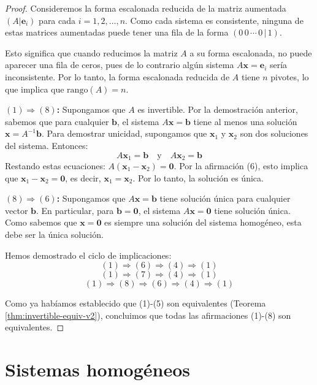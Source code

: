 \begin{proof}
Consideremos la forma escalonada reducida de la matriz aumentada $(A|\mathbf{e}_i)$ para cada $i = 1, 2, \ldots, n$. Como cada sistema es consistente, ninguna de estas matrices aumentadas puede tener una fila de la forma $(0 \, 0 \, \cdots \, 0 \, | \, 1)$.

Esto significa que cuando reducimos la matriz $A$ a su forma escalonada, no puede aparecer una fila de ceros, pues de lo contrario algún sistema $A\mathbf{x}=\mathbf{e}_i$ sería inconsistente. Por lo tanto, la forma escalonada reducida de $A$ tiene $n$ pivotes, lo que implica que $\text{rango}(A) = n$.

\textbf{$(1) \Rightarrow (8)$:}
Supongamos que $A$ es invertible. Por la demostración anterior, sabemos que para cualquier $\mathbf{b}$, el sistema $A\mathbf{x}=\mathbf{b}$ tiene al menos una solución $\mathbf{x} = A^{-1}\mathbf{b}$. Para demostrar unicidad, supongamos que $\mathbf{x}_1$ y $\mathbf{x}_2$ son dos soluciones del sistema. Entonces:
$$A\mathbf{x}_1 = \mathbf{b} \quad \text{y} \quad A\mathbf{x}_2 = \mathbf{b}$$
Restando estas ecuaciones: $A(\mathbf{x}_1 - \mathbf{x}_2) = \mathbf{0}$. Por la afirmación (6), esto implica que $\mathbf{x}_1 - \mathbf{x}_2 = \mathbf{0}$, es decir, $\mathbf{x}_1 = \mathbf{x}_2$. Por lo tanto, la solución es única.

\textbf{$(8) \Rightarrow (6)$:}
Supongamos que $A\mathbf{x}=\mathbf{b}$ tiene solución única para cualquier vector $\mathbf{b}$. En particular, para $\mathbf{b} = \mathbf{0}$, el sistema $A\mathbf{x}=\mathbf{0}$ tiene solución única. Como sabemos que $\mathbf{x} = \mathbf{0}$ es siempre una solución del sistema homogéneo, esta debe ser la única solución.

Hemos demostrado el ciclo de implicaciones:
$$(1) \Rightarrow (6) \Rightarrow (4) \Rightarrow (1)$$
$$(1) \Rightarrow (7) \Rightarrow (4) \Rightarrow (1)$$  
$$(1) \Rightarrow (8) \Rightarrow (6) \Rightarrow (4) \Rightarrow (1)$$

Como ya habíamos establecido que (1)-(5) son equivalentes (Teorema \ref{thm:invertible-equiv-v2}), concluimos que todas las afirmaciones (1)-(8) son equivalentes.
\end{proof}

\section{Sistemas homogéneos}

